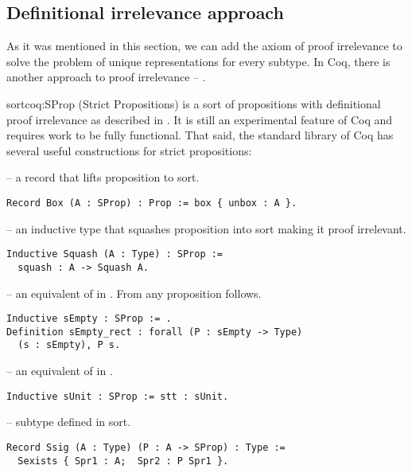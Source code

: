 \subsection{Definitional irrelevance approach}
As it was mentioned in this section, we can add the axiom of proof irrelevance to solve the problem of unique representations for every subtype. In Coq, there is another approach to proof irrelevance -- .
\begin{coq}[]{ sort}{coq:SProp}
 (Strict Propositions) is a sort of propositions with definitional proof irrelevance as described in \cite{BasesOfSProp}. It is still an experimental feature \cite{coqDoc} of Coq and requires work to be fully functional. That said, the standard library of Coq has several useful constructions for strict propositions:
\begin{description}
    \item {} -- a record that lifts  proposition to  sort.
    \begin{verbatim}
Record Box (A : SProp) : Prop := box { unbox : A }.
    \end{verbatim}
    \item {} -- an inductive type that squashes proposition into  sort making it proof irrelevant.
    \begin{verbatim}
Inductive Squash (A : Type) : SProp :=  
  squash : A -> Squash A.
    \end{verbatim}
    \item {} -- an equivalent of  in . From  any proposition follows.
    \begin{verbatim}
Inductive sEmpty : SProp := .
Definition sEmpty_rect : forall (P : sEmpty -> Type) 
  (s : sEmpty), P s.
    \end{verbatim}
    \item {} -- an equivalent of  in .
    \begin{verbatim}
Inductive sUnit : SProp := stt : sUnit.
    \end{verbatim}
    \item {} -- subtype defined in  sort.
    \begin{verbatim}
Record Ssig (A : Type) (P : A -> SProp) : Type :=
  Sexists { Spr1 : A;  Spr2 : P Spr1 }.
    \end{verbatim}
\end{description}
\end{coq}
